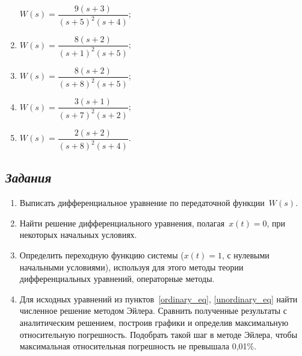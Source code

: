\documentclass[a4paper,oneside,10pt]{book}
\theoremstyle{definition}
\begin{document}
\begin{multicols}{2}
\begin{enumerate}
		$ 	W(s) = 
		\dfrac{9(s+3)}
		{(s+5)^2(s+4)} $;
		
		\item 
		
		$ W(s) = 
		\dfrac{8(s+2)}
		{(s+1)^2(s+5)} $;
		
		\item 
		
		$ W(s) = 
		\dfrac{8(s+2)}
		{(s+8)^2(s+5)} $;
		
		\item 
		
		$ W(s) = 
		\dfrac{3(s+1)}
		{(s+7)^2(s+2)} $;
		
		\item 
		
		$ W(s) = 
		\dfrac{2(s+2)}
		{(s+8)^2(s+4)} $.
		
	\end{enumerate}
\end{multicols}


\subsection*{\textit{Задания}}

\begin{enumerate}
\item
Выписать дифференциальное уравнение по передаточной функции~$ W(s) $.
\item \label{ordinary_eq}
Найти решение дифференциального уравнения, полагая~$ x(t) = 0 $, при некоторых начальных условиях. 
\item \label{unordinary_eq}
Определить переходную функцию системы ($ x(t) =1 $, с нулевыми начальными условиями), используя для этого методы теории дифференциальных уравнений, операторные методы. 
\item
Для исходных уравнений из пунктов~\ref{ordinary_eq}, \ref{unordinary_eq} найти численное решение методом Эйлера. Сравнить полученные результаты с аналитическим решением, построив графики и определив максимальную относительную погрешность.  Подобрать такой шаг в методе Эйлера, чтобы максимальная относительная погрешность не превышала 0,01\%. 


\end{enumerate}
\end{document}
